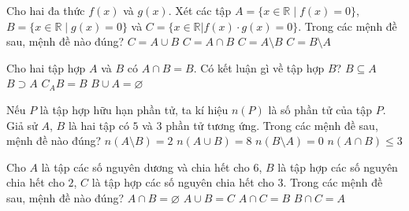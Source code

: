 \begin{ex}%
	Cho hai đa thức $f(x)$ và $g(x)$. Xét các tập $A=\{x\in\mathbb{R}\;\big|\;f(x)=0\}$, $B=\{x\in\mathbb{R}\;\big|\;g(x)=0\}$ và $C=\{x\in\mathbb{R}|f(x)\cdot g(x)=0\}$. Trong các mệnh đề sau, mệnh đề nào đúng?
	\choice
	{\True $C=A\cup B$}
	{$C=A\cap B$}
	{$C=A\setminus B$}
	{$C=B\setminus A$}
\end{ex}

\begin{ex}%
	Cho hai tập hợp $A$ và $B$ có $A\cap B=B$. Có kết luận gì về tập hợp $B$?
	\choice
	{\True $B\subseteq A$}
	{$B\supset A$}
	{$C_AB=B$}
	{$B\cup A=\varnothing$}
\end{ex}

\begin{ex}%
	Nếu $P$ là tập hợp hữu hạn phần tử, ta kí hiệu $n(P)$ là số phần tử của tập $P$. Giả sử $A$, $B$ là hai tập có $5$ và $3$ phần tử tương ứng. Trong các mệnh đề sau, mệnh đề nào đúng?
	\choice
	{$n\left(A\setminus B\right)=2$}
	{$n\left(A\cup B\right)=8$}
	{$n\left(B\setminus A\right)=0$}
	{\True $n\left(A\cap B\right)\leq 3$}
\end{ex}

\begin{ex}%
	Cho $A$ là tập các số nguyên dương và chia hết cho $6$, $B$ là tập hợp các số nguyên chia hết cho $2$, $C$ là tập hợp các số nguyên chia hết cho $3$. Trong các mệnh đề sau, mệnh đề nào đúng?
	\choice
	{$A\cap B=\varnothing$}
	{$A\cup B=C$}
	{$A\cap C=B$}
	{\True $B\cap C=A$}
\end{ex}


